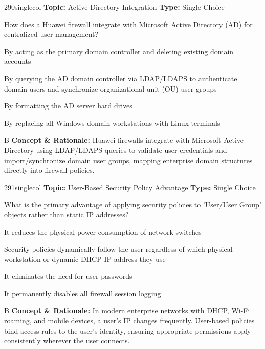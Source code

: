 \begin{qcard}{290}{singlecol}
\textcolor{darkslate!75}{\small\textbf{Topic:} Active Directory Integration \hfill \textbf{Type:} Single Choice}\vspace{0.4em}\par
How does a Huawei firewall integrate with Microsoft Active Directory (AD) for centralized user management?
\begin{qoptions}
\item By acting as the primary domain controller and deleting existing domain accounts
\item By querying the AD domain controller via LDAP/LDAPS to authenticate domain users and synchronize organizational unit (OU) user groups
\item By formatting the AD server hard drives
\item By replacing all Windows domain workstations with Linux terminals
\end{qoptions}
\end{qcard}
\nopagebreak
\begin{explainbox}{B}
\textbf{Concept \& Rationale:} Huawei firewalls integrate with Microsoft Active Directory using LDAP/LDAPS queries to validate user credentials and import/synchronize domain user groups, mapping enterprise domain structures directly into firewall policies.
\end{explainbox}

\begin{qcard}{291}{singlecol}
\textcolor{darkslate!75}{\small\textbf{Topic:} User-Based Security Policy Advantage \hfill \textbf{Type:} Single Choice}\vspace{0.4em}\par
What is the primary advantage of applying security policies to 'User/User Group' objects rather than static IP addresses?
\begin{qoptions}
\item It reduces the physical power consumption of network switches
\item Security policies dynamically follow the user regardless of which physical workstation or dynamic DHCP IP address they use
\item It eliminates the need for user passwords
\item It permanently disables all firewall session logging
\end{qoptions}
\end{qcard}
\nopagebreak
\begin{explainbox}{B}
\textbf{Concept \& Rationale:} In modern enterprise networks with DHCP, Wi-Fi roaming, and mobile devices, a user's IP changes frequently. User-based policies bind access rules to the user's identity, ensuring appropriate permissions apply consistently wherever the user connects.
\end{explainbox}

